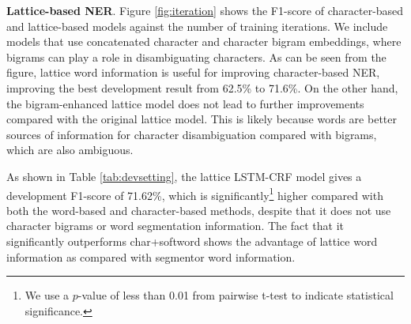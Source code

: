 \documentclass[11pt,a4paper]{article}
\begin{document}
\begin{CJK*}{UTF8}{gbsn}
\begin{table}[!tp]
\begin{center}
\end{center}
\caption{Development results.}
\label{tab:devsetting}
\end{table}
\textbf{Lattice-based NER}. Figure \ref{fig:iteration} shows the F1-score of character-based and lattice-based models against the number of training iterations. We include models that use concatenated character and character bigram embeddings, where bigrams can play a role in disambiguating characters. As can be seen from the figure, lattice word information is useful for improving character-based NER, improving the best development result from 62.5\% to 71.6\%. On the other hand, the bigram-enhanced lattice model does not lead to further improvements compared with the original lattice model. This is likely because words are better sources of information for character disambiguation compared with bigrams, which are also ambiguous. 


As shown in Table \ref{tab:devsetting}, the lattice LSTM-CRF model gives a development F1-score of 71.62\%, which is significantly\footnote{We use a $p$-value of less than 0.01 from pairwise t-test to indicate statistical significance.} higher compared with both the word-based and character-based methods, despite that it does not use character bigrams or word segmentation information. The fact that it significantly outperforms char+softword shows the advantage of lattice word information as compared with segmentor word information.





\end{CJK*}
\end{document}
